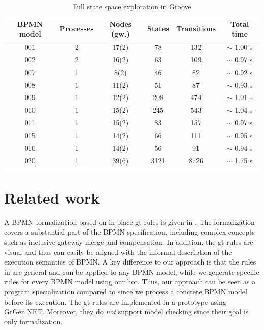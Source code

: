\documentclass[runningheads]{llncs}
\begin{document}
\begin{table}[ht]
\centering

\begin{tabular}{| c | c | c || c | c | c |}
 \hline
 BPMN model & Processes & Nodes (gw.) & States & Transitions & Total time \\
 \hline\hline
 001 & 2 & 17(2) & 78 & 132 & $\sim$ 1.00 s \\
 \hline
 002 & 2 & 16(2) & 63 & 109 & $\sim$ 0.97 s \\
 \hline
 007 & 1 & 8(2) & 46 & 82 & $\sim$ 0.92 s \\
 \hline
 008 & 1 & 11(2) & 51 & 87 & $\sim$ 0.93 s \\
 \hline
 009 & 1 & 12(2) & 208 & 474 & $\sim$ 1.01 s \\
 \hline
 010 & 1 & 15(2) & 245 & 543 & $\sim$ 1.04 s \\
 \hline
 011 & 1 & 15(2) & 83 & 157 & $\sim$ 0.97 s \\
 \hline
 015 & 1 & 14(2) & 66 & 111 & $\sim$ 0.95 s \\
 \hline
 016 & 1 & 14(2) & 56 & 91 & $\sim$ 0.94 s \\
 \hline
 020 & 1 & 39(6) & 3121 & 8726 & $\sim$ 1.75 s \\
 \hline
\end{tabular}
\caption[Full state space exploration in Groove]{Full state space exploration in Groove}
\label{table:stateSpaceBenchmark}
\end{table}

\section{Related work} \label{sec:relatedWork}
A BPMN formalization based on in-place \gls*{gt} rules is given in \cite{vangorpVisualTokenbasedFormalization2013}.
The formalization covers a substantial part of the BPMN specification, including complex concepts such as inclusive gateway merge and compensation.
In addition, the \gls*{gt} rules are visual and thus can easily be aligned with the informal description of the execution semantics of BPMN.
A key difference to our approach is that the rules in \cite{vangorpVisualTokenbasedFormalization2013} are general and can be applied to any BPMN model, while we generate specific rules for every BPMN model using our \gls*{hot}.
Thus, our approach can be seen as a program specialization compared to \cite{vangorpVisualTokenbasedFormalization2013} since we process a concrete BPMN model before its execution.
The \gls*{gt} rules are implemented in a prototype using GrGen.NET.
Moreover, they do \textit{not} support model checking since their goal is only formalization.
\end{document}
